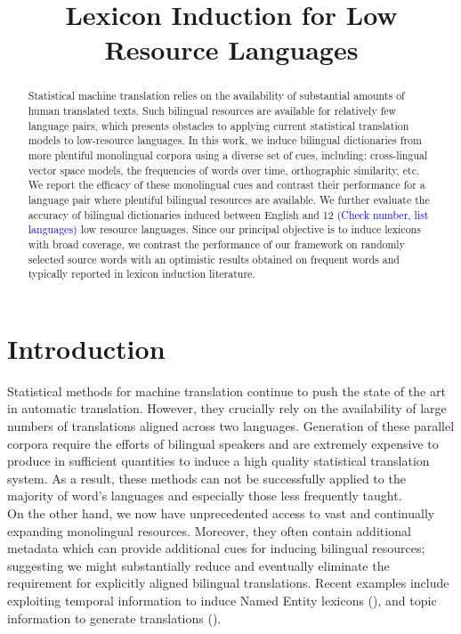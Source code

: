 \documentclass{article}
\title{Lexicon Induction for Low Resource Languages}
\newcommand{\todo}[1]{\textcolor{blue}{(#1)}}
\begin{document}
\maketitle

\begin{abstract}

Statistical machine translation relies on the availability of substantial amounts of human translated texts. Such bilingual resources are available for relatively few language pairs, which presents obstacles to applying current statistical translation models to low-resource languages. In this work, we induce bilingual dictionaries from more plentiful monolingual corpora using a diverse set of cues, including: cross-lingual vector space models, the frequencies of words over time, orthographic similarity, etc.  We report the efficacy of these monolingual cues and contrast their performance for a language pair where plentiful bilingual resources are available.  We further evaluate the accuracy of bilingual dictionaries induced between English and 12 \todo{Check number, list languages} low resource languages.  Since our principal objective is to induce lexicons with broad coverage, we contrast the performance of our framework on randomly selected source words with an optimistic results obtained on frequent words and typically reported in lexicon induction literature. 

\end{abstract}

\section{Introduction}

Statistical methods for machine translation continue to push the state of the art in automatic translation. However, they crucially rely on the availability of large numbers of translations aligned across two languages. Generation of these parallel corpora require the efforts of bilingual speakers and are extremely expensive to produce in sufficient quantities to induce a high quality statistical translation system. As a result, these methods can not be successfully applied to the majority of word's languages and especially those less frequently taught.
\\

On the other hand, we now have unprecedented access to vast and continually expanding monolingual resources. Moreover, they often contain additional metadata which can provide additional cues for inducing bilingual resources; suggesting we might substantially reduce and eventually eliminate the requirement for explicitly aligned bilingual translations. Recent examples include exploiting temporal information to induce Named Entity lexicons (\cite{Schafer:2002,Klementiev:2006b}), and topic information to generate translations (\cite{Mimno:2009}). \\
\end{document}

